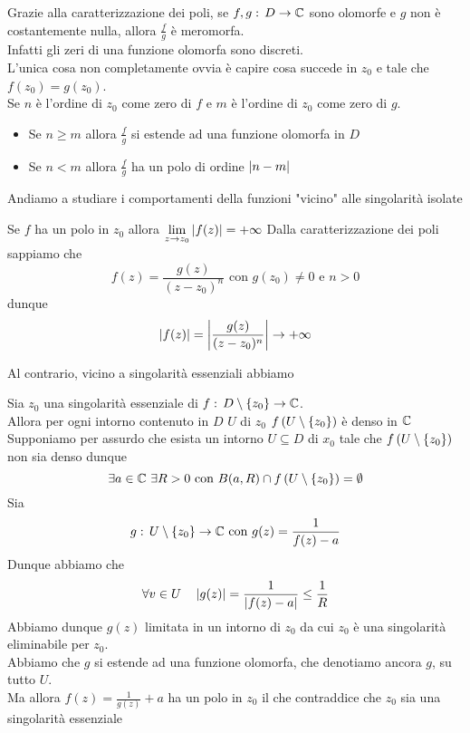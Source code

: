 \begin{oss}Grazie alla caratterizzazione dei poli, se $f,g:\, D \to \mathbb{C}$ sono olomorfe e $g$ non \`e costantemente nulla, allora $\frac{f}{g}$ \`e meromorfa.\\
Infatti gli zeri di una funzione olomorfa sono discreti.\\
L'unica cosa non completamente ovvia \`e capire cosa succede in $z_0$ e tale che $f(z_0) =g(z_0)$.\\
Se $n$ \`e l'ordine di $z_0$ come zero di $f$ e $m$ \`e l'ordine di $z_0$ come zero di $g$.
\begin{itemize}
\item  Se $n\geq m$ allora $\frac{f}{g}$ si estende ad una funzione olomorfa in $D$ 
\item Se $n<m$ allora $\frac{f}{g}$ ha un polo di ordine $\left\vert n-m \right\vert$ 
\end{itemize}
\end{oss}
Andiamo a studiare i comportamenti della funzioni "vicino" alle singolarit\`a isolate
\begin{cor} Se $f$ ha un polo in $z_0$ allora $\displaystyle \lim_{z\to z_0} \left\vert f(z) \right\vert=+\infty$
\proof Dalla caratterizzazione dei poli sappiamo che 
$$ f(z) =\frac{g(z)}{(z-z_0)^n} \text{ con } g(z_0) \neq 0 \text{ e } n>0$$
dunque 
$$\left\vert f(z) \right\vert = \left\vert  \frac{g(z)}{(z-z_0)^n}  \right\vert\to +\infty$$
\end{cor}
Al contrario, vicino a singolarit\`a essenziali abbiamo 
\begin{thm}[di Weistrass]Sia $z_0$ una singolarit\`a essenziale di $f:\, D \setminus \left\{ z_0 \right\}\to \mathbb{C}$.\\
Allora per ogni intorno contenuto in $D$ $U$ di $z_0$ $f\left( U \setminus\left\{ z_0 \right\} \right)$ \`e denso in $\mathbb{C}$
\proof Supponiamo per assurdo che esista un intorno $U\subseteq D$ di $x_0$ tale che $f\left( U\setminus \left\{ z_0 \right\} \right)$ non sia denso dunque 
$$ \exists a \in \mathbb{C} \, \, \exists R>0 \text{ con } B(a,R)\cap f
\left( U\setminus \left\{ z_0 \right\} \right) =\emptyset $$
Sia $$g:\, U \setminus \left\{ z_0 \right\} \to \mathbb{C} \text{ con } g(z) =\frac{1}{f(z)-a}$$
Dunque abbiamo che 
$$\forall v \in U \quad \left\vert g(z) \right\vert =\frac{1}{\left\vert f(z) -a \right\vert}\leq \frac{1}{R}$$
Abbiamo dunque $g(z)$ limitata in un intorno di $z_0$ da cui $z_0$ \`e una singolarit\`a eliminabile per $z_0$.\\
Abbiamo che $g$ si estende ad una funzione olomorfa, che denotiamo ancora $g$,  su tutto $U$.\\
Ma allora $f(z) = \frac{1}{g(z)} +a$ ha un polo in $z_0$ il che contraddice che $z_0$ sia una singolarit\`a essenziale 
\end{thm}
